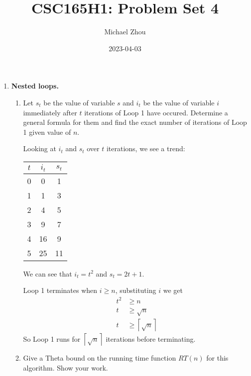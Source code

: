 \documentclass{article}
\title{CSC165H1: Problem Set 4}
\author{Michael Zhou}
\date{2023-04-03}
\begin{document}
\maketitle
\begin{enumerate}
    \item \textbf{Nested loops.}
        \begin{enumerate}[label=(\alph*)]
            \item Let $s_t$ be the value of variable $s$ and $i_t$ be 
                the value of variable $i$ immediately after $t$ iterations 
                of Loop 1 have occured. Determine a general formula for them 
                and find the exact number of iterations of Loop 1 given 
                value of $n$.

                Looking at $i_t$ and $s_t$ over $t$ iterations, we see a trend:
                \begin{center}
                    \begin{tabular}{| c c c  | }
                        \hline
                        $t$ & $i_t$ & $s_t$ \\
                        \hline 
                        0 & 0 & 1 \\
                        1 & 1 & 3 \\
                        2 & 4 & 5 \\ 
                        3 & 9 & 7 \\
                        4 & 16 & 9 \\
                        5 & 25 & 11\\
                        \hline
                    \end{tabular}
                \end{center}
                We can see that $i_t = t^2$ and $s_t = 2t + 1$. 

                Loop 1 terminates when $ i \geq n$, substituting $i$ we get 
                \begin{align*}
                    t^2 &\geq n \\
                    t &\geq \sqrt{n} \\
                    t &\geq \left\lceil \sqrt{n} \right\rceil 
                \end{align*}
                So Loop 1 runs for $\left\lceil \sqrt{n}
                \right\rceil$ iterations before terminating.  
            \newpage
            \item Give a Theta bound on the running time function $RT (n)$ 
                for this algorithm. Show your work.


\end{enumerate}
\end{enumerate}
\end{document}
